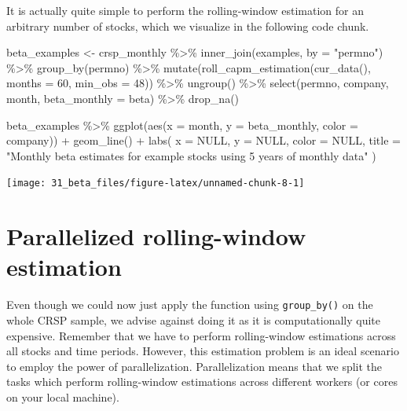 \documentclass[
]{krantz}
\newenvironment{Shaded}{\begin{snugshade}}{\end{snugshade}}
\newcommand{\AttributeTok}[1]{\textcolor[rgb]{0.61,0.61,0.61}{#1}}
\newcommand{\ConstantTok}[1]{\textcolor[rgb]{0,0,0}{#1}}
\newcommand{\DecValTok}[1]{\textcolor[rgb]{0.06,0.06,0.06}{#1}}
\newcommand{\FunctionTok}[1]{\textcolor[rgb]{0,0,0}{#1}}
\newcommand{\NormalTok}[1]{#1}
\newcommand{\OtherTok}[1]{\textcolor[rgb]{0.37,0.37,0.37}{#1}}
\newcommand{\SpecialCharTok}[1]{\textcolor[rgb]{0,0,0}{#1}}
\newcommand{\StringTok}[1]{\textcolor[rgb]{0.5,0.5,0.5}{#1}}
\begin{document}
It is actually quite simple to perform the rolling-window estimation for an arbitrary number of stocks, which we visualize in the following code chunk.

\begin{Shaded}
\begin{Highlighting}[]
\NormalTok{beta\_examples }\OtherTok{\textless{}{-}}\NormalTok{ crsp\_monthly }\SpecialCharTok{\%\textgreater{}\%}
  \FunctionTok{inner\_join}\NormalTok{(examples, }\AttributeTok{by =} \StringTok{"permno"}\NormalTok{) }\SpecialCharTok{\%\textgreater{}\%}
  \FunctionTok{group\_by}\NormalTok{(permno) }\SpecialCharTok{\%\textgreater{}\%}
  \FunctionTok{mutate}\NormalTok{(}\FunctionTok{roll\_capm\_estimation}\NormalTok{(}\FunctionTok{cur\_data}\NormalTok{(), }\AttributeTok{months =} \DecValTok{60}\NormalTok{, }\AttributeTok{min\_obs =} \DecValTok{48}\NormalTok{)) }\SpecialCharTok{\%\textgreater{}\%}
  \FunctionTok{ungroup}\NormalTok{() }\SpecialCharTok{\%\textgreater{}\%}
  \FunctionTok{select}\NormalTok{(permno, company, month, }\AttributeTok{beta\_monthly =}\NormalTok{ beta) }\SpecialCharTok{\%\textgreater{}\%}
  \FunctionTok{drop\_na}\NormalTok{()}

\NormalTok{beta\_examples }\SpecialCharTok{\%\textgreater{}\%}
  \FunctionTok{ggplot}\NormalTok{(}\FunctionTok{aes}\NormalTok{(}\AttributeTok{x =}\NormalTok{ month, }\AttributeTok{y =}\NormalTok{ beta\_monthly, }\AttributeTok{color =}\NormalTok{ company)) }\SpecialCharTok{+}
  \FunctionTok{geom\_line}\NormalTok{() }\SpecialCharTok{+}
  \FunctionTok{labs}\NormalTok{(}
    \AttributeTok{x =} \ConstantTok{NULL}\NormalTok{, }\AttributeTok{y =} \ConstantTok{NULL}\NormalTok{, }\AttributeTok{color =} \ConstantTok{NULL}\NormalTok{,}
    \AttributeTok{title =} \StringTok{"Monthly beta estimates for example stocks using 5 years of monthly data"}
\NormalTok{  )}
\end{Highlighting}
\end{Shaded}

\begin{center}\texttt{[image: 31\_beta\_files/figure-latex/unnamed-chunk-8-1]} \end{center}

\hypertarget{parallelized-rolling-window-estimation}{%
\section{Parallelized rolling-window estimation}\label{parallelized-rolling-window-estimation}}

Even though we could now just apply the function using \texttt{group\_by()} on the whole CRSP sample, we advise against doing it as it is computationally quite expensive.
Remember that we have to perform rolling-window estimations across all stocks and time periods.
However, this estimation problem is an ideal scenario to employ the power of parallelization.
Parallelization means that we split the tasks which perform rolling-window estimations across different workers (or cores on your local machine).
\end{document}
